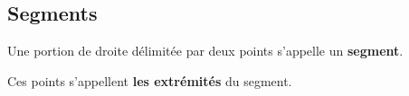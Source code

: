 \begin{pageCours}

\subsection{Segments}

\begin{Def}
Une portion de droite délimitée par deux points s'appelle un \textbf{segment}.

Ces points s'appellent \textbf{les extrémités} du segment.
\end{Def}


\end{pageCours}
